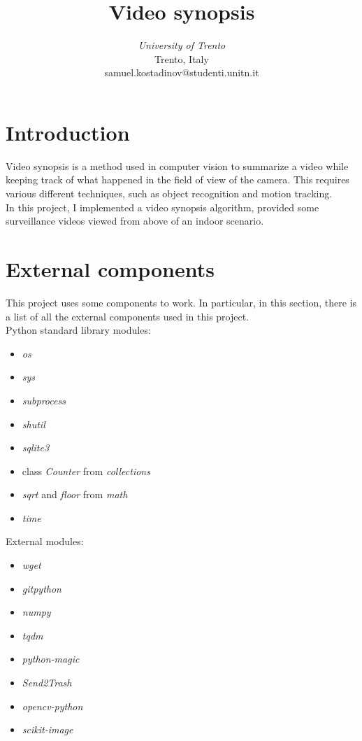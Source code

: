 \documentclass[conference]{IEEEtran}
\begin{document}
	\title{Video synopsis}


	\author{
	\textit{University of Trento}\\
	Trento, Italy \\
	samuel.kostadinov@studenti.unitn.it}

	\maketitle

	\section{Introduction}
		
		Video synopsis is a method used in computer vision to summarize a video while keeping track of what happened in the field of view of the camera.
		This requires various different techniques, such as object recognition and motion tracking.\\
		In this project, I implemented a video synopsis algorithm, provided some surveillance videos viewed from above of an indoor scenario.
		
	\section{External components}
	
		This project uses some components to work. In particular, in this section, there is a list of all the external components used in this project.\\
		Python standard library modules:
		\begin{itemize}
		
			\item \textit{os}
			\item \textit{sys}
			\item \textit{subprocess}
			\item \textit{shutil}
			\item \textit{sqlite3}
			\item class \textit{Counter} from \textit{collections}
			\item \textit{sqrt} and \textit{floor} from \textit{math}
			\item \textit{time}
		
		\end{itemize}
		
		External modules:
		\begin{itemize}
		
			\item \textit{wget}
			\item \textit{gitpython}
			\item \textit{numpy}
			\item \textit{tqdm}
			\item \textit{python-magic}
			\item \textit{Send2Trash}
			\item \textit{opencv-python}
			\item \textit{scikit-image}
		
		\end{itemize}
		
\end{document}
